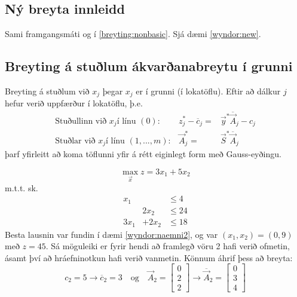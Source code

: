\subsection{Ný breyta innleidd}
Sami framgangsmáti og í \ref{breyting:nonbasic}. Sjá dæmi \ref{wyndor:new}.


\subsection{Breyting á stuðlum ákvarðanabreytu í grunni}
Breyting á stuðlum við $x_j$ þegar $x_j$ er í grunni (í lokatöflu). Eftir að dálkur $j$ hefur verið uppfærður í lokatöflu, þ.e.
\[\begin{array}{lrl}
 \mbox{Stuðullinn við }x_j\mbox{í línu }(0):& z_j^*-\overline{c}_j=&\vec{y}^*\overline{\vec{A}}_j-c_j \\
 \mbox{Stuðlar við }x_j\mbox{í línu }(1,...,m):& \vec{A}_j^*=&\vec{S}^*\overline{\vec{A}}_j
\end{array}\]
þarf yfirleitt að koma töflunni yfir á rétt eiginlegt form með Gauss-eyðingu.
\begin{daemi}$$\max_{\vec{x}} z=3x_1+5x_2$$ m.t.t. sk. \[\begin{array}{crl} x_1 & &\leq 4\\&2x_2&\leq24\\3x_1&+2x_2&\leq18\end{array}\]
Besta lausnin var fundin í dæmi \ref{wyndor:naemni2}, og var $(x_1,x_2)=(0,9)$ með $z=45$. Sá möguleiki er fyrir hendi að framlegð vöru 2 hafi verið ofmetin, ásamt því að hráefninotkun hafi verið vanmetin. Könnum áhrif þess að breyta: 
$$ c_2=5\rightarrow \overline{c}_2=3\quad\mbox{og}\quad \vec{A}_2=\begin{bmatrix}0\\2\\2\end{bmatrix}\rightarrow\overline{\vec{A}}_2=\begin{bmatrix}0\\3\\4\end{bmatrix}$$
\end{daemi}
